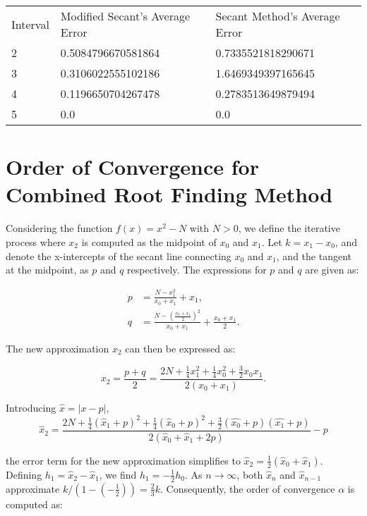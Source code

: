 \documentclass[10pt]{article}
\begin{document}
\vspace{5mm}

\begin{tabular}{lll}
Interval & Modified Secant's Average Error & Secant Method's Average Error \\
2 & 0.5084796670581864 & 0.7335521818290671 \\
3 & 0.3106022555102186 & 1.6469349397165645 \\
4 & 0.1196650704267478 & 0.2783513649879494 \\
5 & 0.0 & 0.0 \\
\end{tabular}
\vspace{5mm}

\section*{Order of Convergence for Combined Root Finding Method}

Considering the function $f(x) = x^2 - N$ with $N > 0$, we define the iterative process where $x_2$ is computed as the midpoint of $x_0$ and $x_1$. Let $k = x_1 - x_0$, and denote the x-intercepts of the secant line connecting $x_0$ and $x_1$, and the tangent at the midpoint, as $p$ and $q$ respectively. The expressions for $p$ and $q$ are given as:

\begin{align*}
p &= \frac{N - x_1^2}{x_0 + x_1} + x_1, \\
q &= \frac{N - \left(\frac{x_0 + x_1}{2}\right)^2}{x_0 + x_1} + \frac{x_0 + x_1}{2}.
\end{align*}

The new approximation $x_2$ can then be expressed as:

\begin{equation*}
x_2 = \frac{p+q}{2} =
 \frac{2N + \frac{1}{4}x_1^2 + \frac{1}{4}x_0^2 + \frac{3}{2}x_0x_1}{2(x_0 + x_1)}.
\end{equation*}

Introducing $\hat{x} = |x - p|$,
\begin{equation*}
\hat{x}_2 = \frac{2N + \frac{1}{4}(\hat{x}_1 + p)^2 + \frac{1}{4}(\hat{x}_0 + p)^2 + \frac{3}{2}(\hat{x_0} + p)(\hat{x_1} + p)}{2(\hat{x}_0 + \hat{x}_1 + 2p)} - p
\end{equation*}

the error term for the new approximation simplifies to $\hat{x}_2 = \frac{1}{2}(\hat{x}_0 + \hat{x}_1)$. Defining $h_1 = \hat{x}_2 - \hat{x}_1$, we find $h_1 = -\frac{1}{2}h_0$. As $n \rightarrow \infty$, both $\hat{x}_n$ and $\hat{x}_{n-1}$ approximate $k / (1 - (-\frac{1}{2})) = \frac{2}{3}k$. Consequently, the order of convergence $\alpha$ is computed as:
\end{document}
